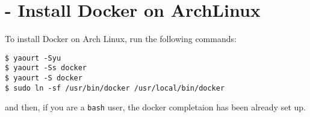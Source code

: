 \section{ - Install Docker on ArchLinux}\label{sec:20150818}

To install Docker on Arch Linux, run the following commands:

\begin{lstlisting}[style=bashStyle]
$ yaourt -Syu
$ yaourt -Ss docker
$ yaourt -S docker
$ sudo ln -sf /usr/bin/docker /usr/local/bin/docker
\end{lstlisting}
and then, if you are a \lstinline!bash! user, the docker completaion has been already set up.